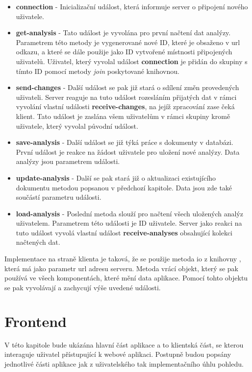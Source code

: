 \begin{itemize}
    \item \textbf{connection} - Inicializační událost, která informuje server o připojení nového uživatele.
    \item \textbf{get-analysis} - Tato událost je vyvolána pro první načtení dat analýzy. Parametrem této metody je vygenerované nové ID, které je obsaženo v url odkazu, a které se dále použije jako ID vytvořené místnosti připojených uživatelů. Uživatel, který vyvolal událost \textbf{connection} je přidán do skupiny s tímto ID pomocí metody \textit{join} poskytované knihovnou. 
    \item \textbf{send-changes} - Další událost se pak již stará o sdílení změn provedených uživateli. Server reaguje na tuto událost rozesláním přijatých dat v rámci vyvolání vlastní události \textbf{receive-changes}, na jejíž zpracování zase čeká klient. Tato událost je zaslána všem uživatelům v rámci skupiny kromě uživatele, který vyvolal původní událost. 
    \item \textbf{save-analysis} - Další událost se již týká práce s dokumenty v databázi. První událost je reakce na žádost uživatele pro uložení nové analýzy. Data analýzy jsou parametrem události.  
    \item \textbf{update-analysis} - Další se pak stará již o aktualizaci existujícího dokumentu metodou popsanou v předchozí kapitole. Data jsou zde také součástí parametru události. 
      \item \textbf{load-analysis} - Poslední metoda slouží pro načtení všech uložených analýz uživatelem. Parametrem této události je ID uživatele. Server jako reakci na tuto událost vyvolá vlastní událost \textbf{receive-analyses} obsahující kolekci načtených dat. 
\end{itemize}

Implementace na straně klienta je taková, že se použije metoda io z knihovny , která má jako parametr url adresu serveru. Metoda vrácí objekt, který se pak používá ve všech komponentách, které mění data aplikace. Pomocí tohto objektu se pak vyvolávají a zachycují výše uvedené události. 



\section{Frontend}
V této kapitole bude ukázána hlavní část aplikace a to klientská část, se kterou interaguje uživatel přístupující k webové aplikaci. Postupně budou popsány jednotlivé části aplikace jak z uživatelského tak implementačního úhlu pohledu. 

